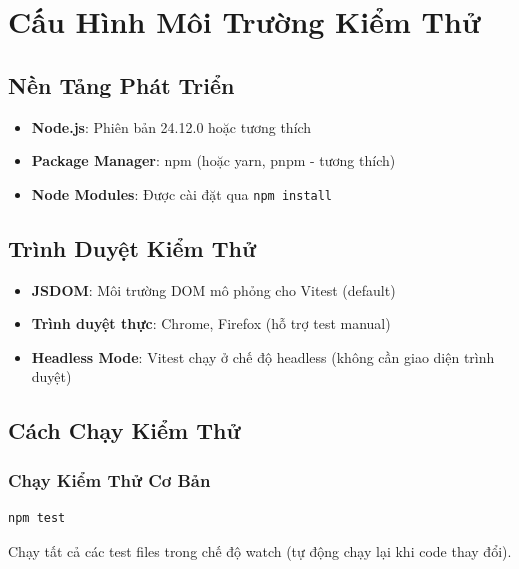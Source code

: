 \documentclass[12pt,a4paper,vietnamese]{article}
\begin{document}

\section{Cấu Hình Môi Trường Kiểm Thử}

\subsection{Nền Tảng Phát Triển}

\begin{itemize}
    \item \textbf{Node.js}: Phiên bản 24.12.0 hoặc tương thích
    \item \textbf{Package Manager}: npm (hoặc yarn, pnpm - tương thích)
    \item \textbf{Node Modules}: Được cài đặt qua \texttt{npm install}
\end{itemize}

\subsection{Trình Duyệt Kiểm Thử}

\begin{itemize}
    \item \textbf{JSDOM}: Môi trường DOM mô phỏng cho Vitest (default)
    \item \textbf{Trình duyệt thực}: Chrome, Firefox (hỗ trợ test manual)
    \item \textbf{Headless Mode}: Vitest chạy ở chế độ headless (không cần giao diện trình duyệt)
\end{itemize}

\subsection{Cách Chạy Kiểm Thử}

\subsubsection{Chạy Kiểm Thử Cơ Bản}
\begin{verbatim}
npm test
\end{verbatim}
Chạy tất cả các test files trong chế độ watch (tự động chạy lại khi code thay đổi).
\end{document}

